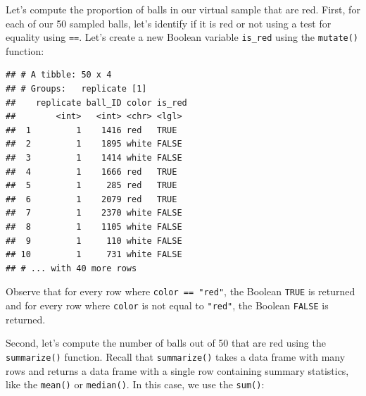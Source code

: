 \documentclass[
]{book}
\newenvironment{Shaded}{\begin{snugshade}}{\end{snugshade}}
\newcommand{\DataTypeTok}[1]{\textcolor[rgb]{0.13,0.29,0.53}{#1}}
\newcommand{\KeywordTok}[1]{\textcolor[rgb]{0.13,0.29,0.53}{\textbf{#1}}}
\newcommand{\NormalTok}[1]{#1}
\newcommand{\OperatorTok}[1]{\textcolor[rgb]{0.81,0.36,0.00}{\textbf{#1}}}
\newcommand{\StringTok}[1]{\textcolor[rgb]{0.31,0.60,0.02}{#1}}
\begin{document}
Let's compute the proportion of balls in our virtual sample that are red. First, for each of our 50 sampled balls, let's identify if it is red or not using a test for equality using \texttt{==}. Let's create a new Boolean variable \texttt{is\_red} using the \texttt{mutate()} function:

\begin{Shaded}
\end{Shaded}

\begin{verbatim}
## # A tibble: 50 x 4
## # Groups:   replicate [1]
##    replicate ball_ID color is_red
##        <int>   <int> <chr> <lgl> 
##  1         1    1416 red   TRUE  
##  2         1    1895 white FALSE 
##  3         1    1414 white FALSE 
##  4         1    1666 red   TRUE  
##  5         1     285 red   TRUE  
##  6         1    2079 red   TRUE  
##  7         1    2370 white FALSE 
##  8         1    1105 white FALSE 
##  9         1     110 white FALSE 
## 10         1     731 white FALSE 
## # ... with 40 more rows
\end{verbatim}

Observe that for every row where \texttt{color\ ==\ "red"}, the Boolean \texttt{TRUE} is returned and for every row where \texttt{color} is not equal to \texttt{"red"}, the Boolean \texttt{FALSE} is returned.

Second, let's compute the number of balls out of 50 that are red using the \texttt{summarize()} function. Recall that \texttt{summarize()} takes a data frame with many rows and returns a data frame with a single row containing summary statistics, like the \texttt{mean()} or \texttt{median()}. In this case, we use the \texttt{sum()}:

\begin{Shaded}
\end{Shaded}
\end{document}
